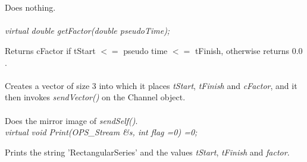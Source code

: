  \\
\\ 
Does nothing. \\

 \\
{\em  virtual double getFactor(double pseudoTime);}

Returns cFactor if tStart $<=$ pseudo time $<=$ tFinish, otherwise
returns $0.0$. \\ 

\\
Creates a vector of size 3 into which it places {\em tStart}, {\em
tFinish} and {\em cFactor}, and it then invokes {\em sendVector()} on
the Channel object. \\ 

\\
Does the mirror image of {\em sendSelf()}. \\

{\em  virtual void Print(OPS_Stream \&s, int flag =0) =0;}

Prints the string 'RectangularSeries' and the values {\em tStart}, {\em
tFinish} and {\em factor}. 